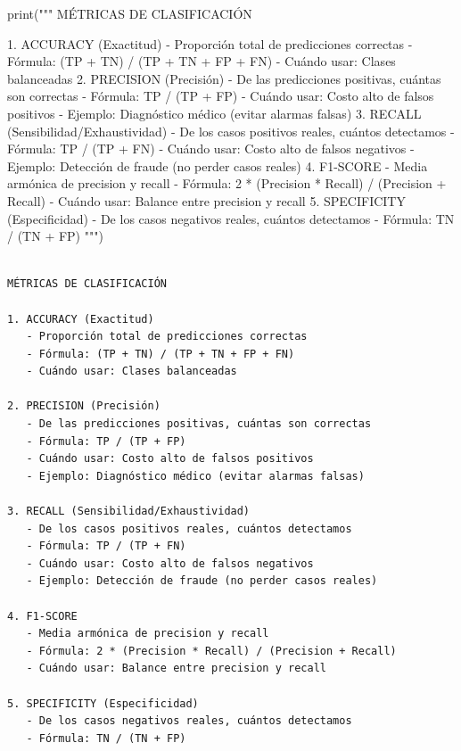 \documentclass[
  doc,
  floatsintext,
  longtable,
  a4paper,
  nolmodern,
  notxfonts,
  notimes,
  12pt,
  colorlinks=true,linkcolor=blue,citecolor=blue,urlcolor=blue]{apa7}
\newenvironment{Shaded}{\begin{snugshade}}{\end{snugshade}}
\newcommand{\BuiltInTok}[1]{\textcolor[rgb]{0.00,0.23,0.31}{#1}}
\newcommand{\NormalTok}[1]{\textcolor[rgb]{0.00,0.23,0.31}{#1}}
\newcommand{\StringTok}[1]{\textcolor[rgb]{0.13,0.47,0.30}{#1}}
\begin{document}
\begin{Shaded}
\begin{Highlighting}[]
\BuiltInTok{print}\NormalTok{(}\StringTok{"""}
\StringTok{MÉTRICAS DE CLASIFICACIÓN}

\StringTok{1. ACCURACY (Exactitud)}
\StringTok{   {-} Proporción total de predicciones correctas}
\StringTok{   {-} Fórmula: (TP + TN) / (TP + TN + FP + FN)}
\StringTok{   {-} Cuándo usar: Clases balanceadas}
\StringTok{   }
\StringTok{2. PRECISION (Precisión)}
\StringTok{   {-} De las predicciones positivas, cuántas son correctas}
\StringTok{   {-} Fórmula: TP / (TP + FP)}
\StringTok{   {-} Cuándo usar: Costo alto de falsos positivos}
\StringTok{   {-} Ejemplo: Diagnóstico médico (evitar alarmas falsas)}
\StringTok{   }
\StringTok{3. RECALL (Sensibilidad/Exhaustividad)}
\StringTok{   {-} De los casos positivos reales, cuántos detectamos}
\StringTok{   {-} Fórmula: TP / (TP + FN)}
\StringTok{   {-} Cuándo usar: Costo alto de falsos negativos}
\StringTok{   {-} Ejemplo: Detección de fraude (no perder casos reales)}
\StringTok{   }
\StringTok{4. F1{-}SCORE}
\StringTok{   {-} Media armónica de precision y recall}
\StringTok{   {-} Fórmula: 2 * (Precision * Recall) / (Precision + Recall)}
\StringTok{   {-} Cuándo usar: Balance entre precision y recall}
\StringTok{   }
\StringTok{5. SPECIFICITY (Especificidad)}
\StringTok{   {-} De los casos negativos reales, cuántos detectamos}
\StringTok{   {-} Fórmula: TN / (TN + FP)}
\StringTok{"""}\NormalTok{)}
\end{Highlighting}
\end{Shaded}

\begin{verbatim}

MÉTRICAS DE CLASIFICACIÓN

1. ACCURACY (Exactitud)
   - Proporción total de predicciones correctas
   - Fórmula: (TP + TN) / (TP + TN + FP + FN)
   - Cuándo usar: Clases balanceadas

2. PRECISION (Precisión)
   - De las predicciones positivas, cuántas son correctas
   - Fórmula: TP / (TP + FP)
   - Cuándo usar: Costo alto de falsos positivos
   - Ejemplo: Diagnóstico médico (evitar alarmas falsas)

3. RECALL (Sensibilidad/Exhaustividad)
   - De los casos positivos reales, cuántos detectamos
   - Fórmula: TP / (TP + FN)
   - Cuándo usar: Costo alto de falsos negativos
   - Ejemplo: Detección de fraude (no perder casos reales)

4. F1-SCORE
   - Media armónica de precision y recall
   - Fórmula: 2 * (Precision * Recall) / (Precision + Recall)
   - Cuándo usar: Balance entre precision y recall

5. SPECIFICITY (Especificidad)
   - De los casos negativos reales, cuántos detectamos
   - Fórmula: TN / (TN + FP)
\end{verbatim}
\end{document}

